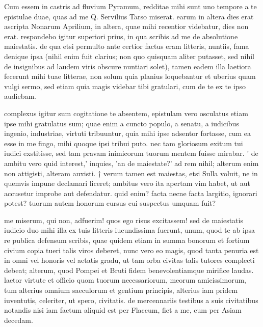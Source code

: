 


 Cum essem in castris ad fluvium Pyramum, redditae mihi sunt uno tempore a te epistulae duae, quas ad me Q. Servilius Tarso miserat. earum in altera dies erat ascripta Nonarum Aprilium, in altera, quae mihi recentior videbatur, dies non erat. respondebo igitur superiori prius, in qua scribis ad me de absolutione maiestatis. de qua etsi permulto ante certior factus eram litteris, nuntiis, fama denique ipsa (nihil enim fuit clarius; non quo quisquam aliter putasset, sed nihil de insignibus ad laudem viris obscure nuntiari solet), tamen eadem illa laetiora fecerunt mihi tuae litterae, non solum quia planius loquebantur et uberius quam vulgi sermo, sed etiam quia magis videbar tibi gratulari, cum de te ex te ipso audiebam.

 complexus igitur sum cogitatione te absentem, epistulam vero osculatus etiam ipse mihi gratulatus sum; quae enim a cuncto populo, a senatu, a iudicibus ingenio, industriae, virtuti tribuuntur, quia mihi ipse adsentor fortasse, cum ea esse in me fingo, mihi quoque ipsi tribui puto. nec tam gloriosum exitum tui iudici exstitisse, sed tam pravam inimicorum tuorum mentem fuisse mirabar. ' de ambitu vero quid interest,' inquies, 'an de maiestate?' ad rem nihil; alterum enim non attigisti, alteram auxisti. † verum tamen est maiestas, etsi Sulla voluit, ne in quemvis impune declamari liceret; ambitus vero ita apertam vim habet, ut aut accusetur improbe aut defendatur. quid enim? facta necne facta largitio, ignorari potest? tuorum autem honorum cursus cui suspectus umquam fuit?

 me miserum, qui non, adfuerim! quos ego risus excitassem! sed de maiestatis iudicio duo mihi illa ex tuis litteris iucundissima fuerunt, unum, quod te ab ipsa re publica defensum scribis, quae quidem etiam in summa bonorum et fortium civium copia tueri talis viros deberet, nunc vero eo magis, quod tanta penuria est in omni vel honoris vel aetatis gradu, ut tam orba civitas talis tutores complecti debeat; alterum, quod Pompei et Bruti fidem benevolentiamque mirifice laudas. laetor virtute et officio quom tuorum necessariorum, meorum amicissimorum, tum alterius omnium saeculorum et gentium principis, alterius iam pridem iuventutis, celeriter, ut spero, civitatis. de mercennariis testibus a suis civitatibus notandis nisi iam factum aliquid est per Flaccum, fiet a me, cum per Asiam decedam.

